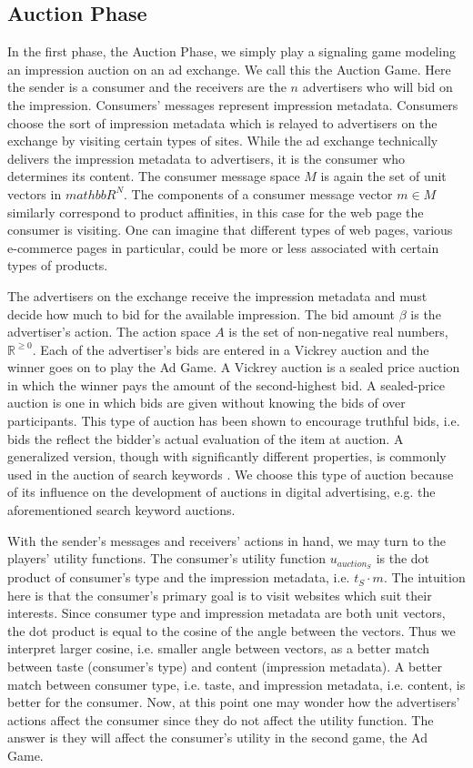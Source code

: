 \documentclass{article}
\begin{document}
\subsection{Auction Phase}

In the first phase, the Auction Phase, we simply play a signaling game modeling an impression auction on an ad exchange. We call this the Auction Game. Here the sender is a consumer and the receivers are the $n$ advertisers who will bid on the impression. Consumers' messages represent impression metadata. Consumers choose the sort of impression metadata which is relayed to advertisers on the exchange by visiting certain types of sites. While the ad exchange technically delivers the impression metadata to advertisers, it is the consumer who determines its content. The consumer message space $M$ is again the set of unit vectors in $mathbb{R}^N$. The components of a consumer message vector $m \in M$ similarly correspond to product affinities, in this case for the web page the consumer is visiting. One can imagine that different types of web pages, various e-commerce pages in particular, could be more or less associated with certain types of products. 

The advertisers on the exchange receive the impression metadata and must decide how much to bid for the available impression. The bid amount $\beta$ is the advertiser's action. The action space $A$ is the set of non-negative real numbers, $\mathbb{R}^{\ge 0}$. Each of the advertiser's bids are entered in a Vickrey auction \cite{vickrey_auctions} and the winner goes on to play the Ad Game. A Vickrey auction is a sealed price auction in which the winner pays the amount of the second-highest bid. A sealed-price auction is one in which bids are given without knowing the bids of over participants. This type of auction has been shown to encourage truthful bids, i.e. bids the reflect the bidder's actual evaluation of the item at auction. A generalized version, though with significantly different properties, is commonly used in the auction of search keywords \cite{edelman_gsp}. We choose this type of auction because of its influence on the development of auctions in digital advertising, e.g. the aforementioned search keyword auctions.

With the sender's messages and receivers' actions in hand, we may turn to the players' utility functions. The consumer's utility function $u_{auction_S}$ is the dot product of consumer's type and the impression metadata, i.e. $t_S \cdot m$. The intuition here is that the consumer's primary goal is to visit websites which suit their interests. Since consumer type and impression metadata are both unit vectors, the dot product is equal to the cosine of the angle between the vectors. Thus we interpret larger cosine, i.e. smaller angle between vectors, as a better match between taste (consumer's type) and content (impression metadata). A better match between consumer type, i.e. taste, and impression metadata, i.e. content, is better for the consumer. Now, at this point one may wonder how the advertisers' actions affect the consumer since they do not affect the utility function. The answer is they will affect the consumer's utility in the second game, the Ad Game.
\end{document}
